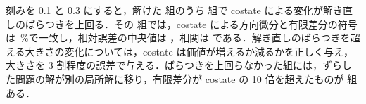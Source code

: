 刻みを 0.1 と 0.3 にすると，解けた \fdBigN 組のうち \fdBigResolvable 組で costate による変化が解き直しのばらつきを上回る．その \fdBigResolvable 組では，costate による方向微分と有限差分の符号は \fdBigSign\,\%で一致し，相対誤差の中央値は \fdBigRel，相関は \fdBigCorr である．解き直しのばらつきを超える大きさの変化については，costate は価値が増えるか減るかを正しく与え，大きさを 3 割程度の誤差で与える．ばらつきを上回らなかった組には，ずらした問題の解が別の局所解に移り，有限差分が costate の 10 倍を超えたものが \fdOutlier 組ある．
